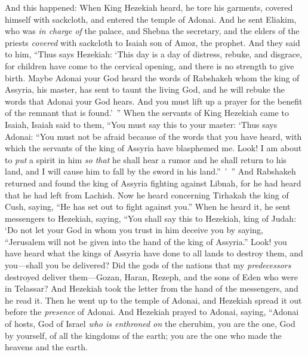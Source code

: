 \begin{biblechapter} %
 And this happened: When King Hezekiah heard, he tore his garments, covered himself with sackcloth, and entered the temple of Adonai.
\verse And he sent Eliakim, who was \textit{in charge of} the palace, and Shebna the secretary, and the elders of the priests \textit{covered} with sackcloth to Isaiah son of Amoz, the prophet.
\verse And they said to him, “Thus says Hezekiah: ‘This day is a day of distress, rebuke, and disgrace, for children have come to the cervical opening, and there is no strength to give birth.
\verse Maybe Adonai your God heard the words of Rabshakeh whom the king of Assyria, his master, has sent to taunt the living God, and he will rebuke the words that Adonai your God hears. And you must lift up a prayer for the benefit of the remnant that is found.’ ”
\verse When the servants of King Hezekiah came to Isaiah,
\verse Isaiah said to them, “You must say this to your master: ‘Thus says Adonai: “You must not be afraid because of the words that you have heard, with which the servants of the king of Assyria have blasphemed me.
\verse Look! I am about to \textit{put} a spirit in him \textit{so that} he shall hear a rumor and he shall return to his land, and I will cause him to fall by the sword in his land.” ’ ”
\verse And Rabshakeh returned and found the king of Assyria fighting against Libnah, for he had heard that he had left from Lachish.
\verse Now he heard concerning Tirhakah the king of Cush, saying, “He has set out to fight against you.”
\verse When he heard it, he sent messengers to Hezekiah, saying,
\verse “You shall say this to Hezekiah, king of Judah: ‘Do not let your God in whom you trust in him deceive you by saying, “Jerusalem will not be given into the hand of the king of Assyria.”
\verse Look! you have heard what the kings of Assyria have done to all lands to destroy them, and you—shall you be delivered?
\verse Did the gods of the nations that my \textit{predecessors} destroyed deliver them—Gozan, Haran, Rezeph, and the sons of Eden who were in Telassar?
 And Hezekiah took the letter from the hand of the messengers, and he read it. Then he went up to the temple of Adonai, and Hezekiah spread it out before the \textit{presence} of Adonai.
\verse And Hezekiah prayed to Adonai, saying,
\verse “Adonai of hosts, God of Israel \textit{who is enthroned on} the cherubim, you are the one, God by yourself, of all the kingdoms of the earth; you are the one who made the heavens and the earth.

\end{biblechapter}
